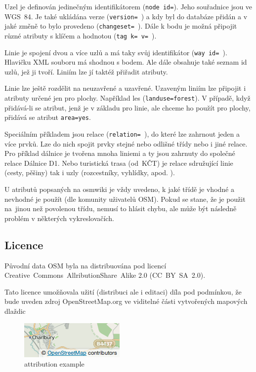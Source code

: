 Uzel je definován jedinečným identifikátorem ({\tt node id=}). Jeho 
souřadnice jsou ve WGS~­84. Je také ukládána verze ({\tt version= }) a kdy 
byl do databáze přidán a v jaké změně to bylo provedeno ({\tt changeset=~}). 
Dále k bodu je možná připojit různé atributy s klíčem a hodnotou ({\tt tag~k=~v=~}). 

Linie je spojení dvou a více uzlů a má taky svůj identifikátor ({\tt way~id=~}).
Hlavičku XML souboru má shodnou s bodem. Ale dále obsahuje také seznam id uzlů, 
jež ji tvoří. Liniím lze jí taktéž přiřadit atributy.  

Linie lze ještě rozdělit na neuzavřené a uzavřené. Uzaveným liniím lze připojit 
i atributy určené jen pro plochy. Například les ({\tt landuse=forest}).
V případě, když přidává-li se atribut, jenž je v základu pro linie, ale chceme
ho použít pro plochy, přidává se atribut {\tt area=yes}.

Speciálním příkladem jsou relace ({\tt relation= }), do které lze zahrnout 
jeden a více prvků. Lze do nich spojit prvky stejné nebo odlišné třídy 
nebo i jiné relace. Pro příklad dálnice je tvořena mnoha liniemi a ty 
jsou zahrnuty do společné relace Dálnice D1. Nebo turistická trasa 
(od~KČT) je relace sdružující linie (cesty, pěšiny) tak i uzly 
(rozcestníky, vyhlídky, apod. ).

U atributů popsaných na osmwiki je vždy uvedeno, k jaké třídě je 
vhodné a nevhodné je použít (dle komunity uživatelů OSM). Pokud se stane, že je použit 
na~jinou než povolenou třídu, nemusí to hlásit chybu, ale může být následně 
problém v některých vykreslovačích. \cite{OSMfeatures}

\subsection{Licence}
\label{licence}

Původní data OSM byla na distribuována pod licencí 
Creative~Commons~Allribution­Share~Alike 2.0 (CC~BY~­SA~2.0). 


Tato licence umožňovala užití (distribuci ale i editaci) díla pod podmínkou, 
že bude uveden zdroj OpenStreetMap.org ve viditelné části 
vytvořených mapových dlaždic \cite{OSMlicence} 

  \begin{figure}[hbt]
    \centering
      \includegraphics{./pictures/attribution_example.png}
      \caption{attribution example}
      \label{fig:attribution_example}
  \end{figure} 

